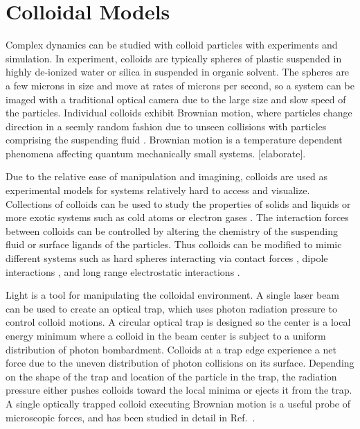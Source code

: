 \documentclass[twocolumn,preprintnumbers,amsmath,amssymb,aps,prx]{revtex4}
\begin{document}

%
%


\section{Colloidal Models}
\label{sec:colloids}

Complex dynamics can be studied with
colloid particles with experiments and simulation.
In experiment, colloids are typically spheres of 
plastic suspended in
highly de-ionized water or silica in suspended in organic solvent.
The spheres are a few microns in size
and move at rates of microns per second,
so a system can be imaged
with a traditional optical camera
due to the large size and slow speed of the particles.
Individual colloids exhibit 
Brownian motion,
where particles change direction in a seemly random fashion
due to unseen 
collisions 
with particles comprising the suspending fluid \cite{}.
Brownian motion is a temperature dependent
phenomena affecting quantum mechanically small systems. \cite{}
[elaborate].

Due to the relative ease of
manipulation and imagining, 
colloids are used as experimental models
for systems relatively hard to access and visualize. 
Collections of colloids can
be used to study the properties of solids and liquids
or more exotic systems 
such as cold atoms or electron gases \cite{Grier2003}.  
The interaction forces between colloids can be controlled 
by altering the chemistry of the suspending fluid
or surface ligands of the particles.
Thus colloids can 
be modified to mimic different
systems such as hard spheres interacting via contact forces \cite{},
dipole interactions \cite{},
and long range electrostatic interactions \cite{}.

Light is a
tool for manipulating the colloidal environment.
A single laser beam can be used to create an optical trap,
which uses 
photon radiation pressure to
control colloid motions.
A circular optical trap is designed so the center is
a local energy minimum where 
a colloid in the beam center is subject to a
uniform distribution of photon bombardment. %
Colloids at a trap edge
experience a net force
due to the uneven 
distribution of photon collisions on its surface.
Depending on the shape of the trap and location of the particle in the trap,
the radiation pressure either pushes colloids toward the local minima
or ejects it from the trap.
A single optically trapped colloid executing Brownian motion
is a useful probe of microscopic forces,
and has been studied in detail in Ref.~\cite{Volpe2013}.
\end{document}
